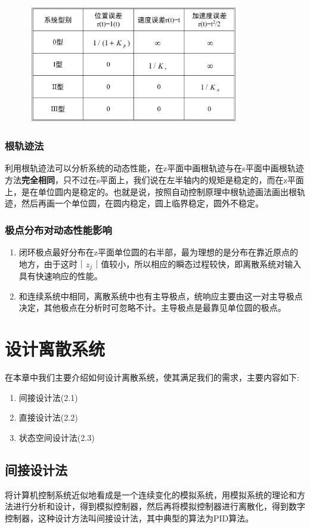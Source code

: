 \documentclass[12pt, a4paper, oneside]{ctexbook}
\begin{document}
\begin{figure}[htbp]
	\centering
	\includegraphics[width=9.32cm,height=5.23cm]{img/4_2.png}
\end{figure}
\subsection{根轨迹法} 
利用根轨迹法可以分析系统的动态性能，在z平面中画根轨迹与在s平面中画根轨迹方法\textbf{完全相同}，只不过在s平面上，我们说在左半轴内的规矩是稳定的，而在z平面上，是在单位圆内是稳定的。也就是说，按照自动控制原理中根轨迹画法画出根轨迹，然后再画一个单位圆，在圆内稳定，圆上临界稳定，圆外不稳定。

\subsection{极点分布对动态性能影响} 
\begin{enumerate} 
	\item 闭环极点最好分布在z平面单位圆的右半部，最为理想的是分布在靠近原点的地方，由于这时$｜z_j｜$值较小，所以相应的瞬态过程较快，即离散系统对输入具有快速响应的性能。
	\item 和连续系统中相同，离散系统中也有主导极点，统响应主要由这一对主导极点决定，其他极点在分析时可忽略不计。主导极点是最靠见单位圆的极点。
\end{enumerate}
\newpage
\chapter{设计离散系统}
在本章中我们主要介绍如何设计离散系统，使其满足我们的需求，主要内容如下:
\begin{enumerate} 
	\item 间接设计法(2.1)
	\item 直接设计法(2.2)
	\item 状态空间设计法(2.3)
\end{enumerate}
\newpage
\section{间接设计法}
将计算机控制系统近似地看成是一个连续变化的模拟系统，用模拟系统的理论和方法进行分析和设计，得到模拟控制器，然后再将模拟控制器进行离散化，得到数字控制器，这种设计方法叫间接设计法，其中典型的算法为PID算法。
\end{document}
